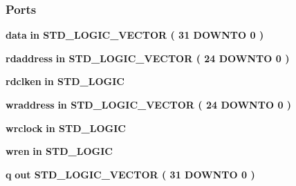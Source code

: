 \subsubsection*{Ports}
 \begin{DoxyCompactItemize}
\item 
{\bf data}  {\bfseries {\bfseries \textcolor{keywordflow}{in}\textcolor{vhdlchar}{ }}} {\bfseries \textcolor{comment}{S\+T\+D\+\_\+\+L\+O\+G\+I\+C\+\_\+\+V\+E\+C\+T\+OR}\textcolor{vhdlchar}{ }\textcolor{vhdlchar}{(}\textcolor{vhdlchar}{ }\textcolor{vhdlchar}{ } \textcolor{vhdldigit}{31} \textcolor{vhdlchar}{ }\textcolor{keywordflow}{D\+O\+W\+N\+TO}\textcolor{vhdlchar}{ }\textcolor{vhdlchar}{ } \textcolor{vhdldigit}{0} \textcolor{vhdlchar}{ }\textcolor{vhdlchar}{)}\textcolor{vhdlchar}{ }} 
\item 
{\bf rdaddress}  {\bfseries {\bfseries \textcolor{keywordflow}{in}\textcolor{vhdlchar}{ }}} {\bfseries \textcolor{comment}{S\+T\+D\+\_\+\+L\+O\+G\+I\+C\+\_\+\+V\+E\+C\+T\+OR}\textcolor{vhdlchar}{ }\textcolor{vhdlchar}{(}\textcolor{vhdlchar}{ }\textcolor{vhdlchar}{ } \textcolor{vhdldigit}{24} \textcolor{vhdlchar}{ }\textcolor{keywordflow}{D\+O\+W\+N\+TO}\textcolor{vhdlchar}{ }\textcolor{vhdlchar}{ } \textcolor{vhdldigit}{0} \textcolor{vhdlchar}{ }\textcolor{vhdlchar}{)}\textcolor{vhdlchar}{ }} 
\item 
{\bf rdclken}  {\bfseries {\bfseries \textcolor{keywordflow}{in}\textcolor{vhdlchar}{ }}} {\bfseries \textcolor{comment}{S\+T\+D\+\_\+\+L\+O\+G\+IC}\textcolor{vhdlchar}{ }} 
\item 
{\bf wraddress}  {\bfseries {\bfseries \textcolor{keywordflow}{in}\textcolor{vhdlchar}{ }}} {\bfseries \textcolor{comment}{S\+T\+D\+\_\+\+L\+O\+G\+I\+C\+\_\+\+V\+E\+C\+T\+OR}\textcolor{vhdlchar}{ }\textcolor{vhdlchar}{(}\textcolor{vhdlchar}{ }\textcolor{vhdlchar}{ } \textcolor{vhdldigit}{24} \textcolor{vhdlchar}{ }\textcolor{keywordflow}{D\+O\+W\+N\+TO}\textcolor{vhdlchar}{ }\textcolor{vhdlchar}{ } \textcolor{vhdldigit}{0} \textcolor{vhdlchar}{ }\textcolor{vhdlchar}{)}\textcolor{vhdlchar}{ }} 
\item 
{\bf wrclock}  {\bfseries {\bfseries \textcolor{keywordflow}{in}\textcolor{vhdlchar}{ }}} {\bfseries \textcolor{comment}{S\+T\+D\+\_\+\+L\+O\+G\+IC}\textcolor{vhdlchar}{ }} 
\item 
{\bf wren}  {\bfseries {\bfseries \textcolor{keywordflow}{in}\textcolor{vhdlchar}{ }}} {\bfseries \textcolor{comment}{S\+T\+D\+\_\+\+L\+O\+G\+IC}\textcolor{vhdlchar}{ }} 
\item 
{\bf q}  {\bfseries {\bfseries \textcolor{keywordflow}{out}\textcolor{vhdlchar}{ }}} {\bfseries \textcolor{comment}{S\+T\+D\+\_\+\+L\+O\+G\+I\+C\+\_\+\+V\+E\+C\+T\+OR}\textcolor{vhdlchar}{ }\textcolor{vhdlchar}{(}\textcolor{vhdlchar}{ }\textcolor{vhdlchar}{ } \textcolor{vhdldigit}{31} \textcolor{vhdlchar}{ }\textcolor{keywordflow}{D\+O\+W\+N\+TO}\textcolor{vhdlchar}{ }\textcolor{vhdlchar}{ } \textcolor{vhdldigit}{0} \textcolor{vhdlchar}{ }\textcolor{vhdlchar}{)}\textcolor{vhdlchar}{ }} 
\end{DoxyCompactItemize}


